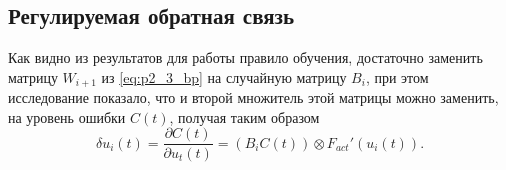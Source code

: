 \subsection{Регулируемая обратная связь}
\iffalse
\indent Не смотря на то, что на сегодняшний день правило обратного распространения ошибки до сих является наиболее популярным и наиболее эффективным методом обучения нейронных сетей, биологическая оправданность этого способа стоит под вопросом не менее давно \cite{rumelhart1986david, grossberg1987competitive, crick1989recent}.\\
\indent Серия работ на тематику регулируемой обратной связи (\textit{feedback alignment}) \cite{lillicrap2014random, nokland2016direct, liao2015important} открывает новые направления работ на тематику методов обучения равных по эффективности методу обратному распространению ошибки, но исключающие наиболее ненатуральный момент в нём -- необходимость обратного распространения информации в сети.\\
\fi
\indent Как видно из результатов \cite{lillicrap2014random} для работы правило обучения, достаточно заменить матрицу $W_{i+1}$ из \eqref{eq:p2_3_bp} на случайную матрицу $B_{i}$, при этом исследование  \cite{nokland2016direct} показало, что и второй множитель этой матрицы можно заменить, на уровень ошибки $C(t)$, получая таким образом
\begin{equation} \label{eq:p2_3_fa}
\delta u_{i}(t) = \frac{\partial C(t)}{\partial u_{t}(t)} = (B_{i} C(t)) \otimes F_{act}'(u_{i}(t)).
\end{equation}
 
